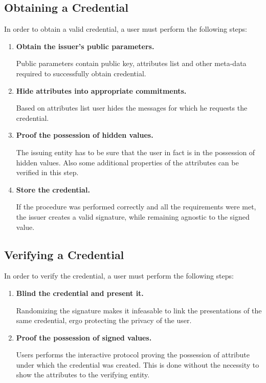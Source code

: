 \subsection*{Obtaining a Credential}
In order to obtain a valid credential, a user must perform the following steps:
\begin{enumerate}
    \item \textbf{Obtain the issuer's public parameters.}
    
    Public parameters contain public key, attributes list and other meta-data required to successfully obtain credential.
    
    \item \textbf{Hide attributes into appropriate commitments.}
    
    Based on attributes list user hides the messages for which he requests the credential.
    
    \item \textbf{Proof the possession of hidden values.}
    
    The issuing entity has to be sure that the user in fact is in the possession of hidden values. Also some additional properties of the attributes can be verified in this step.
    
    \item \textbf{Store the credential.}
    
    If the procedure was performed correctly and all the requirements were met, the issuer creates a valid signature, while remaining agnostic to the signed value.
\end{enumerate}


\subsection*{Verifying a Credential}
In order to verify the credential, a user must perform the following steps:
\begin{enumerate}
    \item \textbf{Blind the credential and present it.}
    
    Randomizing the signature makes it infeasable to link the presentations of the same credential, ergo protecting the privacy of the user.
    
    \item \textbf{Proof the possession of signed values.}
    
    Users performs the interactive protocol proving the possession of attribute under which the credential was created. This is done without the necessity to show the attributes to the verifying entity.
\end{enumerate}




